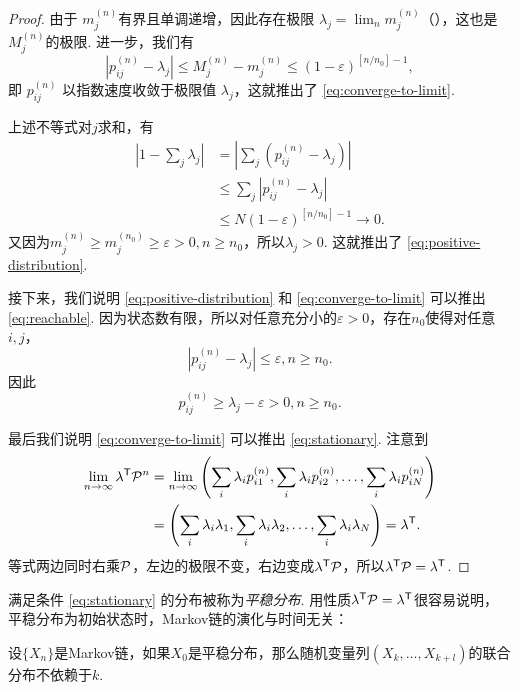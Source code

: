 \begin{proof}
由于 $m_j^{(n)}$有界且单调递增，因此存在极限 $\lambda_j = \lim _n m_j^{(n)}$（），这也是$M_j^{(n)}$的极限. 进一步，我们有
\[
    \left|p_{i j}^{(n)} - \lambda_j\right| \leq M_j^{(n)} - m_j^{(n)} \leq (1-\varepsilon)^{\left[n / n_0\right] - 1},
\]
即 $p_{i j}^{(n)}$ 以指数速度收敛于极限值 $\lambda_j$，这就推出了 \eqref{eq:converge-to-limit}.

上述不等式对$j$求和，有
\begin{align*}
    \left|1-\sum_{j} \lambda_j\right|&=\left|\sum_{j}\left(p_{i j}^{(n)} - \lambda_j\right)\right|\\
    &\leq \sum_{j}\left|p_{i j}^{(n)} - \lambda_j\right|\\
    &\leq N(1-\varepsilon)^{\left[n / n_0\right] - 1}\to 0.
\end{align*}
又因为$m_j^{(n)} \geqslant m_j^{\left(n_0\right)} \geqslant \varepsilon > 0, n \geqslant n_0$，所以$\lambda_j > 0$. 这就推出了 \eqref{eq:positive-distribution}.

接下来，我们说明 \eqref{eq:positive-distribution} 和 \eqref{eq:converge-to-limit} 可以推出 \eqref{eq:reachable}.  因为状态数有限，所以对任意充分小的$\varepsilon > 0$，存在$n_0$使得对任意$i,j$，
\[
\left|p_{i j}^{(n)} - \lambda_j\right| \leq \varepsilon, n \geq n_0.
\]
因此
\[
p_{i j}^{(n)} \geq \lambda_j - \varepsilon > 0, n \geq n_0.
\]

最后我们说明 \eqref{eq:converge-to-limit} 可以推出 \eqref{eq:stationary}. 注意到
\begin{align*}
    \lim_{n \to \infty} \lambda^{\mathsf{T}} \mathcal P^n &=\lim_{n \to \infty} \left(\sum_i \lambda_i p_{i1}^{(n)}, \sum_i \lambda_i p_{i2}^{(n)}, \ldots, \sum_i \lambda_i p_{iN}^{(n)}\right)\\
    &=\left(\sum_i \lambda_i \lambda_1, \sum_i \lambda_i \lambda_2, \ldots, \sum_i \lambda_i \lambda_N\right)=\lambda^{\mathsf{T}}.
\end{align*}
等式两边同时右乘$\mathcal P$，左边的极限不变，右边变成$\lambda^{\mathsf{T}} \mathcal P$，所以$\lambda^{\mathsf{T}} \mathcal P = \lambda^{\mathsf{T}}$.
\end{proof}

满足条件 \eqref{eq:stationary} 的分布被称为\textit{平稳分布}. 用性质$\lambda^{\mathsf{T}} \mathcal P = \lambda^{\mathsf{T}}$很容易说明，平稳分布为初始状态时，Markov链的演化与时间无关：
\begin{proposition}\label{proposition:stationary-distribution}
设$\{X_n\}$是Markov链，如果$X_0$是平稳分布，那么随机变量列$(X_k,\dots,X_{k+l})$的联合分布不依赖于$k$.
\end{proposition}

